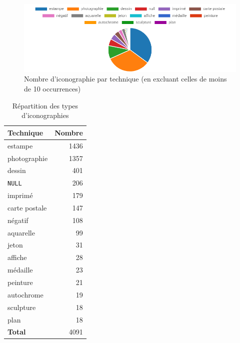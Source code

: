 \begin{enumerate}
\begin{enumerate}
                \begin{figure}[ht!]
                    \centering
                    \includegraphics[width=1\linewidth]{images/graphiques/nb_icono_technique>10.png}
                    \caption{Nombre d'iconographie par technique (en excluant celles de moins de 10 occurrences)}
                    \label{fig:nb_icono_technique}
                \end{figure}

\begin{table}[h!]
\centering
\begin{tabular}{|l|r|}
\toprule
\textbf{Technique} & \textbf{Nombre} \\ \hline
estampe        & 1436 \\ 
photographie   & 1357 \\ 
dessin         & 401  \\ 
\texttt{NULL}  & 206  \\ 
imprimé        & 179  \\ 
carte postale  & 147  \\ 
négatif        & 108  \\
aquarelle      & 99   \\
jeton          & 31   \\
affiche        & 28   \\
médaille       & 23   \\
peinture       & 21   \\
autochrome     & 19   \\
sculpture      & 18   \\
plan           & 18   \\ 
\midrule
\textbf{Total} & 4091 \\
\bottomrule
\end{tabular}
\caption{Répartition des types d'iconographies}
\label{tab:repartition_iconographies}
\end{table}


\newpage  


\end{enumerate}
\end{enumerate}
